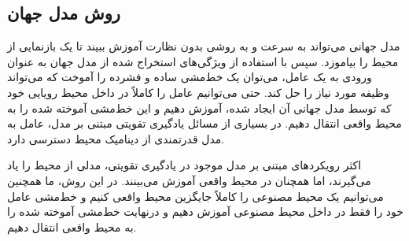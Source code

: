 %
%

\subsection{روش مدل جهان}
مدل جهانی
 می‌تواند به سرعت و به روشی بدون نظارت آموزش ببیند تا یک بازنمایی از محیط را بیاموزد. سپس با استفاده از ویژگی‌های استخراج شده از مدل جهان به عنوان ورودی به یک عامل، می‌توان یک خط‌مشی ساده و فشرده را آموخت که می‌تواند وظیفه مورد نیاز را حل کند. حتی می‌توانیم عامل را کاملاً در داخل محیط رویایی خود که توسط مدل جهانی آن ایجاد شده، آموزش دهیم و این خط‌مشی آموخته شده را به محیط واقعی انتقال دهیم. در بسیاری از مسائل یادگیری تقویتی مبتنی بر مدل، عامل به مدل قدرتمندی از دینامیک محیط دسترسی دارد.


اکثر رویکردهای مبتنی بر مدل موجود در یادگیری تقویتی، مدلی از محیط را یاد می‌گیرند، اما همچنان در محیط واقعی آموزش می‌بینند. در این روش، ما همچنین می‌توانیم یک محیط  مصنوعی را کاملاً جایگزین محیط واقعی کنیم و خط‌مشی عامل خود را فقط در داخل محیط مصنوعی آموزش دهیم و درنهایت خط‌مشی آموخته شده را به محیط واقعی انتقال دهیم.

